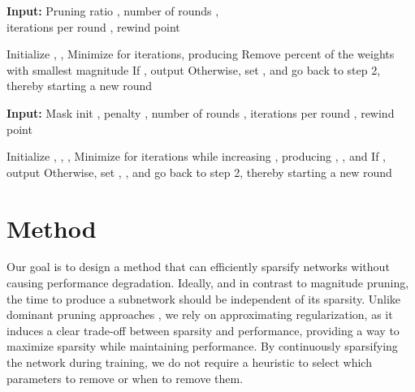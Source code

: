 \documentclass{article}
\newcommand{\citep}[1]{\cite{#1}}
\newcommand{\method}{Continuous Sparsification}
\begin{document}
 \begin{minipage}[t]{.49\textwidth}
\begin{algorithm}[H]
    \textbf{Input:} Pruning ratio , number of rounds ,\\iterations per round , rewind point 
    \caption{Iterative Magnitude Pruning \citep{lth2}}
    \begin{algorithmic}[1]
    \State Initialize , , 
    \State Minimize  for  iterations, producing 
    \State Remove  percent of the weights with smallest magnitude
    \State If , output 
    \State Otherwise, set ,  and go back to step 2, thereby starting a new round
    \end{algorithmic}
\label{alg:imp}
\end{algorithm}
\end{minipage}\hfill
\begin{minipage}[t]{.49\textwidth}
  \vspace{0pt}
\begin{algorithm}[H]
    \textbf{Input:} Mask init , penalty , number of rounds , iterations per round , rewind point 
    \caption{\method}
    \begin{algorithmic}[1]
    \vspace{1.25pt}
    \State Initialize , , , 
    \State Minimize  for  iterations while increasing , producing , , and 
    \State If , output 
    \State Otherwise, set , ,  and go back to step 2, thereby starting a new round
    \end{algorithmic}
\label{alg:ours}
\end{algorithm}
\vspace{0.5pt}
\end{minipage}

\section{Method}

Our goal is to design a method that can efficiently sparsify networks without causing performance degradation. Ideally, and in contrast to magnitude pruning, the time to produce a subnetwork should be independent of its sparsity. Unlike dominant pruning approaches \cite{magnitudepruning,gmp,dnw}, we rely on approximating  regularization, as it induces a clear trade-off between sparsity and performance, providing a way to maximize sparsity while maintaining performance. By continuously sparsifying the network during training, we do not require a heuristic to select which parameters to remove or when to remove them.
\end{document}
